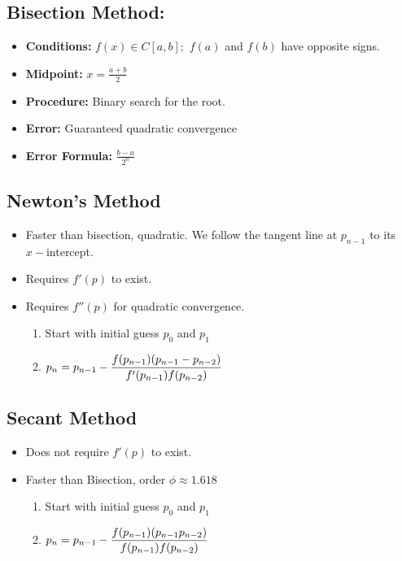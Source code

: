 \documentclass[8pt, letterpaper]{extarticle}
\begin{document}
\begin{multicols*}{3}
  \subsection{Bisection Method:}

  \begin{itemize}
    \item \textbf{Conditions:} $f(x) \in C[a,b];$ \newline
      $f(a)$ and $f(b)$ have opposite signs.
    \item \textbf{Midpoint:} $x = \frac{a+b}{2}$
    \item \textbf{Procedure:} Binary search for the root.
    \item \textbf{Error:} Guaranteed quadratic convergence 
    \item \textbf{Error Formula:} $\frac{b-a}{2^n}$
  \end{itemize}

  \subsection{Newton's Method}
  \begin{itemize}
    \item Faster than bisection, quadratic. We follow the tangent line at $p_{n-1}$ to its
      $x-$intercept.
    \item Requires $f'(p)$ to exist.
    \item Requires $f''(p)$ for quadratic convergence.
      \begin{enumerate}
        \item Start with initial guess $p_0$ and $p_1$
        \item $\displaystyle p_n = p_{n-1} -
          \frac{f(p_{n-1})\pqty{p_{n-1}-p_{n-2}}}{f'(p_{n-1})f(p_{n-2})}$
      \end{enumerate}
  \end{itemize}

  \subsection{Secant Method}
  \begin{itemize}
    \item Does not require $f'(p)$ to exist.
    \item Faster than Bisection, order $\phi \approx 1.618$
      \begin{enumerate}
      \item Start with initial guess $p_0$ and $p_1$
      \item $\displaystyle p_n = p_{n-1} -
        \frac{f(p_{n-1})\pqty{p_{n-1}p_{n-2}}}{f(p_{n-1})f(p_{n-2})}$
      \end{enumerate}
  \end{itemize}


\end{multicols*}
\end{document}
